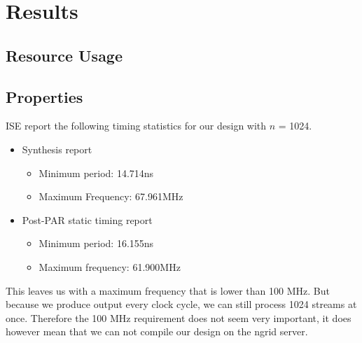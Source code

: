 \section{Results}
\subsection{Resource Usage}
\subsection{Properties}
ISE report the following timing statistics for our design with $n$ = 1024. 
\begin{itemize}
\item
Synthesis report
\begin{itemize}
\item Minimum period: 14.714ns
\item Maximum Frequency: 67.961MHz
\end{itemize}
\item
Post-PAR static timing report
\begin{itemize}
\item  Minimum period:   16.155ns  
\item Maximum frequency: 61.900MHz
\end{itemize}
\end{itemize}
 This leaves us with a maximum frequency that is lower than 100 MHz. But because we produce output every clock cycle, we can still process 1024 streams at once. Therefore the 100 MHz requirement does not seem very important, it does however mean that we can not compile our design on the ngrid server. 
